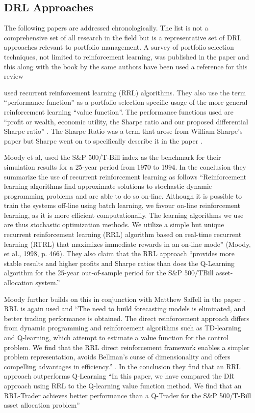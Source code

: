 \documentclass[oneside,12pt]{Classes/RoboticsLaTeX}
\begin{document}
\begin{itemize}
\subsection{DRL Approaches}
The following papers are addressed chronologically. The list is not a comprehensive set of all research in the field but is a representative set of DRL approaches relevant to portfolio management. A survey of portfolio selection techniques, not limited to reinforcement learning, was published in the paper  \citet{LiBin2014OpsA} and this along with the book by the same authors \citet{LiBin2016OPSP} have been used a reference for this review

\citet{MoodyJohn1998Pfar} used recurrent reinforcement learning (RRL) algorithms. They also use the term “performance function” as a portfolio selection specific usage of the more general reinforcement learning “value function”. The performance functions used are “profit or wealth, economic utility, the Sharpe ratio and our proposed differential Sharpe ratio” \citep[p1]{MoodyJohn1998Pfar}. The Sharpe Ratio was a term that arose from William Sharpe’s paper \citep{SharpeWilliamF1964CAPA} but Sharpe went on to specifically describe it in the paper \citep{Sharpe94}. 

 Moody et al, used the S\&P 500/T-Bill index as the benchmark for their simulation results for a 25-year period from 1970 to 1994.  In the conclusion they summarize the use of recurrent reinforcement learning as follows “Reinforcement learning algorithms find approximate solutions to stochastic dynamic programming problems and are able to do so on-line. Although it is possible to train the systems off-line using batch learning, we favour on-line reinforcement learning, as it is more efficient computationally. The learning algorithms we use are thus stochastic optimization methods. We utilize a simple but unique recurrent reinforcement learning (RRL) algorithm based on real-time recurrent learning (RTRL) that maximizes immediate rewards in an on-line mode” (Moody, et al., 1998, p. 466). They also claim that the RRL approach “provides more stable results and higher profits and Sharpe ratios than does the Q-Learning algorithm for the 25-year out-of-sample period for the S&P 500/TBill asset-allocation system.” \citep[467]{MoodyJohn1998Pfar}
 
Moody further builds on this in conjunction with Matthew Saffell in the paper \citet{MoodyJ2001Lttv}.  RRL is again used and “The need to build forecasting models is eliminated, and better trading performance is obtained. The direct reinforcement approach differs from dynamic programming and reinforcement algorithms such as TD-learning and Q-learning, which attempt to estimate a value function for the control problem. We find that the RRL direct reinforcement framework enables a simpler problem representation, avoids Bellman’s curse of dimensionality and offers compelling advantages in efficiency.” \citep[p875]{MoodyJ2001Lttv}. In the conclusion they find that an RRL approach outperforms Q-Learning “In this paper, we have compared the DR approach using RRL to the Q-learning value function method. We find that an RRL-Trader achieves better performance than a Q-Trader for the S\&P 500/T-Bill asset allocation problem” 


\end{itemize}
\end{document}
